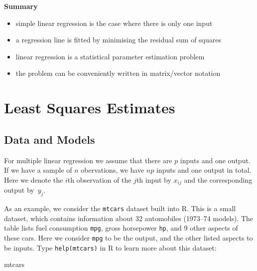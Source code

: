 \documentclass[
  a4paper,
]{article}
\newenvironment{Shaded}{\begin{snugshade}}{\end{snugshade}}
\newcommand{\NormalTok}[1]{#1}
\providecommand{\tightlist}{%
  \setlength{\itemsep}{0pt}\setlength{\parskip}{0pt}}
\theoremstyle{definition}
\theoremstyle{definition}
\theoremstyle{definition}
\theoremstyle{definition}
\theoremstyle{remark}
\begin{document}
\textbf{Summary}

\begin{itemize}
\tightlist
\item
  simple linear regression is the case where there is only one input
\item
  a regression line is fitted by minimising the residual sum of squares
\item
  linear regression is a statistical parameter estimation problem
\item
  the problem can be conveniently written in matrix/vector notation
\end{itemize}

\clearpage

\hypertarget{S02-multiple}{%
\section{Least Squares Estimates}\label{S02-multiple}}

\hypertarget{data-and-models}{%
\subsection{Data and Models}\label{data-and-models}}

For multiple linear regression we assume that there are \(p\) inputs and
one output. If we have a sample of \(n\) obervations, we have \(np\)
inputs and one output in total. Here we denote the \(i\)th observation
of the \(j\)th input by \(x_{ij}\) and the corresponding output by~\(y_j\).

As an example, we consider the \texttt{mtcars} dataset built into R. This is
a small dataset, which contains information about 32 automobiles
(1973--74 models). The table lists fuel consumption \texttt{mpg}, gross horsepower \texttt{hp},
and 9 other aspects of these cars. Here we consider \texttt{mpg} to be the output,
and the other listed aspects to be inputs. Type \texttt{help(mtcars)} in R to learn
more about this dataset:

\begin{Shaded}
\begin{Highlighting}[]
\NormalTok{mtcars}
\end{Highlighting}
\end{Shaded}
\end{document}
